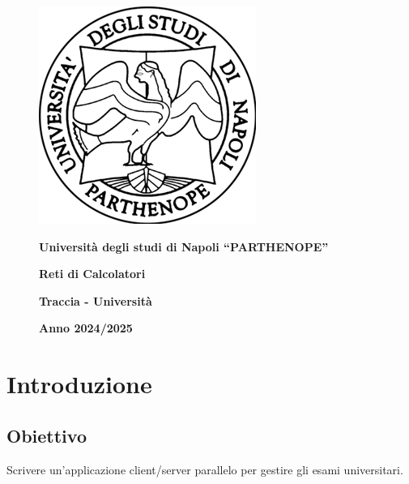 \documentclass[12pt]{article}
\begin{document}
\thispagestyle{firstpage}

\begin{figure}[H]
\centering
\includegraphics[width=0.50\linewidth]{logo.PNG}

\vspace{1cm}

{\Huge \textbf{Università degli studi di Napoli “PARTHENOPE”}}

\vspace{1cm}

{\Huge \textbf{Reti di Calcolatori}}

\vspace{1cm}

{\Large \textbf{Traccia - Università}}

\vspace{4cm}

{\textbf{Anno 2024/2025}}

\end{figure}

\newpage

\tableofcontents
\newpage

\section{Introduzione}
\subsection{Obiettivo}
Scrivere un'applicazione client/server parallelo per gestire gli esami universitari.
\end{document}
